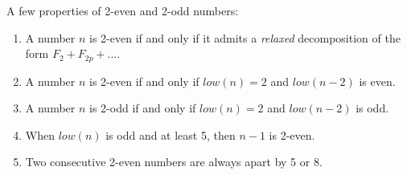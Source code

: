 \documentclass[a4paper,11pt]{article}
\begin{document}
A few properties of 2-even and 2-odd numbers:
\begin{theorem}
\noindent
\begin{enumerate}
\item A number $n$ is 2-even if and only if it admits
a \emph{relaxed} decomposition of the form $F_2 + F_{2p}+...$.
\item A number $n$ is 2-even if and only if $low(n)=2$ and
$low(n-2)$ is even.
\item A number $n$ is 2-odd if and only if $low(n)=2$ and
$low(n-2)$ is odd.
\item When $low(n)$ is odd and at least 5, then $n-1$ is 2-even.
\item Two consecutive 2-even numbers are always apart by 5 or 8.
\end{enumerate}
\end{theorem}
\end{document}
